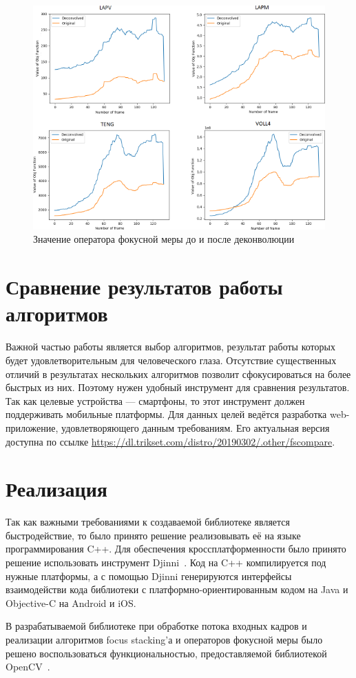 \documentclass[14pt]{matmex-diploma-custom}
\begin{document}
\begin{figure}[h]
\centering
\includegraphics[width=1.0\textwidth]{figures/deconvolution2.png}
\caption{Значение оператора фокусной меры до и после деконволюции}
\label{deconvolution2}
\end{figure}


\section{Сравнение результатов работы алгоритмов}

Важной частью работы является выбор алгоритмов, результат работы которых будет удовлетворительным для человеческого глаза. Отсутствие существенных отличий в результатах нескольких алгоритмов позволит сфокусироваться на более быстрых из них. Поэтому нужен удобный инструмент для сравнения результатов. Так как целевые устройства --- смартфоны, то этот инструмент должен поддерживать мобильные платформы. Для данных целей ведётся разработка web-приложение, удовлетворяющего данным требованиям. Его актуальная версия доступна по ссылке \url{https://dl.trikset.com/distro/20190302/.other/fscompare}. 

\section{Реализация}

Так как важными требованиями к создаваемой библиотеке является быстродействие, то было принято решение реализовывать её на языке программирования C++. Для обеспечения кроссплатформенности было принято решение использовать инструмент Djinni~\cite{Djinni}. Код на C++ компилируется под нужные платформы, а с помощью Djinni генерируются интерфейсы взаимодействи кода библиотеки с платформно-ориентированным кодом на Java и Objective-C на Android и iOS. 
\par
В разрабатываемой библиотеке при обработке потока входных кадров и реализации алгоритмов focus stacking'а и операторов фокусной меры было решено воспользоваться функциональностью, предоставляемой библиотекой OpenCV~\cite{OpenCV}.
\end{document}
